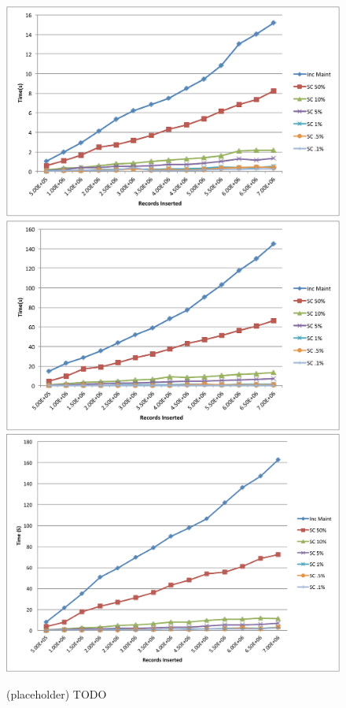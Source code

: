 \begin{figure}[h]
\label{exp3dist}
\centering
\includegraphics[scale=0.20]{exp/select.pdf}
\includegraphics[scale=0.20]{exp/join.pdf}
 \includegraphics[scale=0.20]{exp/agg.pdf}
 \caption{(placeholder) TODO}
\end{figure}


